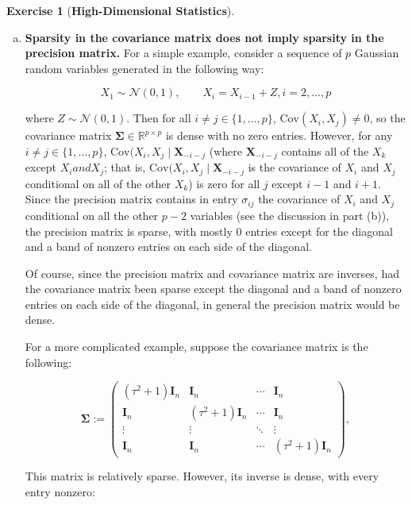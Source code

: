 \documentclass{article}
\theoremstyle{definition}
\newtheorem{exercise}{Exercise}
\theoremstyle{definition}
\theoremstyle{definition}
\theoremstyle{definition}
\theoremstyle{definition}
\newcommand{\Cov}{\mathrm{Cov}}
\begin{document}
\begin{exercise}[\textbf{High-Dimensional Statistics}]

\begin{enumerate}[(a)]

\item \textbf{Sparsity in the covariance matrix does not imply sparsity in the precision matrix.} For a simple example, consider a sequence of \(p\) Gaussian random variables generated in the following way:

\[
X_1 \sim \mathcal{N}(0, 1), \qquad X_i = X_{i-1} + Z, i = 2, \ldots, p
\]

where \(Z \sim \mathcal{N}(0,1)\). Then for all \(i \neq j \in \{1, \ldots, p\}\), \(\Cov(X_i, X_j) \neq 0\), so the covariance matrix \(\boldsymbol{\Sigma} \in \mathbb{R}^{p \times p}\) is dense with no zero entries. However, for any \(i \neq j \in \{1, \ldots, p\}\), \(\Cov(X_i, X_j \mid \boldsymbol{X}_{-i-j}\) (where \(\boldsymbol{X}_{-i-j}\) contains all of the \(X_k\) except \(X_i and X_j\); that is, \(\Cov(X_i, X_j \mid \boldsymbol{X}_{-i-j}\) is the covariance of \(X_i\) and \(X_j\) conditional on all of the other \(X_k\)) is zero for all \(j\) except \(i-1\) and \(i+1\). Since the precision matrix contains in entry \(\sigma_{ij}\) the covariance of \(X_i\) and \(X_j\) conditional on all the other \(p-2\) variables (see the discussion in part (b)), the precision matrix is sparse, with mostly 0 entries except for the diagonal and a band of nonzero entries on each side of the diagonal.

Of course, since the precision matrix and covariance matrix are inverses, had the covariance matrix been sparse except the diagonal and a band of nonzero entries on each side of the diagonal, in general the precision matrix would be dense.

For a more complicated example, suppose the covariance matrix is the following:

\[
\boldsymbol{\Sigma} := \begin{pmatrix}
(\tau^2  + 1) \boldsymbol{I}_n &  \boldsymbol{I}_n & \cdots & \boldsymbol{I}_n \\
\boldsymbol{I}_n  & (\tau^2 + 1)  \boldsymbol{I}_n  & \cdots &  \boldsymbol{I}_n \\
\vdots & \vdots &  \ddots & \vdots \\
\boldsymbol{I}_n & \boldsymbol{I}_n  &  \cdots & (\tau^2 + 1) \boldsymbol{I}_n
\end{pmatrix},
\]

This matrix is relatively sparse. However, its inverse is dense, with every entry nonzero:


\end{enumerate}
\end{exercise}
\end{document}
